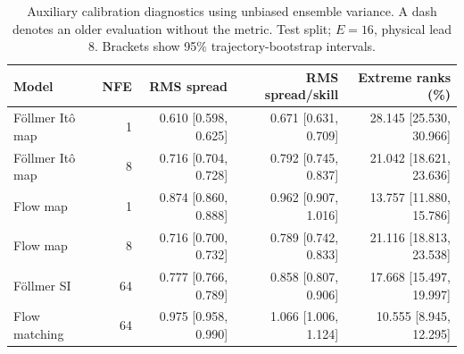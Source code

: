 \begin{table}[t]
\centering
\small
\setlength{\tabcolsep}{3pt}
\caption{Auxiliary calibration diagnostics using unbiased ensemble variance. A dash denotes an older evaluation without the metric. Test split; $E=16$, physical lead 8. Brackets show 95\% trajectory-bootstrap intervals.}
\label{tab:map-rms-calibration}
\begin{tabular}{lrrrr}
\toprule
Model & NFE & RMS spread & RMS spread/skill & Extreme ranks (\%) \\
\midrule
Föllmer Itô map & 1 & 0.610 [0.598, 0.625] & 0.671 [0.631, 0.709] & 28.145 [25.530, 30.966] \\
Föllmer Itô map & 8 & 0.716 [0.704, 0.728] & 0.792 [0.745, 0.837] & 21.042 [18.621, 23.636] \\
\addlinespace
Flow map & 1 & 0.874 [0.860, 0.888] & 0.962 [0.907, 1.016] & 13.757 [11.880, 15.786] \\
Flow map & 8 & 0.716 [0.700, 0.732] & 0.789 [0.742, 0.833] & 21.116 [18.813, 23.538] \\
\addlinespace
Föllmer SI & 64 & 0.777 [0.766, 0.789] & 0.858 [0.807, 0.906] & 17.668 [15.497, 19.997] \\
\addlinespace
Flow matching & 64 & 0.975 [0.958, 0.990] & 1.066 [1.006, 1.124] & 10.555 [8.945, 12.295] \\
\bottomrule
\end{tabular}
\end{table}
